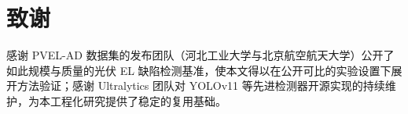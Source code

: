 \documentclass[journal,onecolumn,11pt]{IEEEtran}
\begin{document}
\section*{致谢}
感谢 PVEL-AD 数据集的发布团队（河北工业大学与北京航空航天大学）公开了如此规模与质量的光伏 EL 缺陷检测基准，使本文得以在公开可比的实验设置下展开方法验证；感谢 Ultralytics 团队对 YOLOv11 等先进检测器开源实现的持续维护，为本工程化研究提供了稳定的复用基础。



\end{document}
